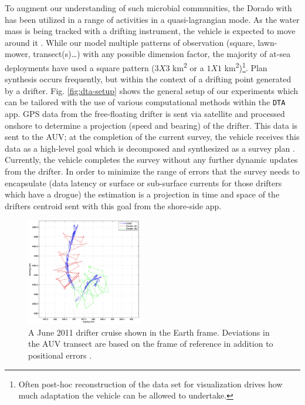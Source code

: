 To augment our understanding of such microbial communities, the Dorado
with \rx has been utilized in a range of activities in a
quasi-lagrangian mode. As the water mass is being tracked with a
drifting instrument, the vehicle is expected to move around it
. While our
model  multiple patterns of observation (square,
lawn-mower, transect(s)\dots) with any possible dimension factor, the
majority of at-sea deployments have used a square pattern ($3X3$
km\textsuperscript{2} or a $1X1$ km\textsuperscript{2})\footnote{Often
  post-hoc reconstruction of the data set for visualization drives how
  much adaptation the vehicle can be allowed to undertake.}. Plan
synthesis occurs frequently, but within the context of a drifting
point generated by a drifter. 
Fig. \ref{fig:dta-setup} shows the general setup of our experiments
which can be tailored with the use of various computational methods
within the \texttt{DTA} app. GPS data from the free-floating drifter
is sent via satellite and processed onshore to determine a projection
(speed and bearing) of the drifter. This data is sent to the AUV; at
the completion of the current survey, the vehicle receives this data
as a high-level goal which is decomposed and synthesized as a survey
plan . Currently, the vehicle
completes the survey without any further dynamic updates from the
drifter. In order to minimize the range of errors that the survey
needs to encapsulate (data latency or surface or sub-surface currents
for those drifters which have a drogue) the estimation is a projection
in time and space of the drifters centroid sent with this goal from
the shore-side app.

\begin{figure}[htpb]
\centering
\includegraphics[width=0.45\textwidth]{figs/june11-drifter-follow-180-181.jpeg}
\caption{\small{A June 2011 drifter cruise shown in the Earth
    frame. Deviations in the AUV transect are based on the frame of
    reference in addition to positional errors \cite{das11b}.}}
\label{fig:drifter-errors}
\end{figure}

